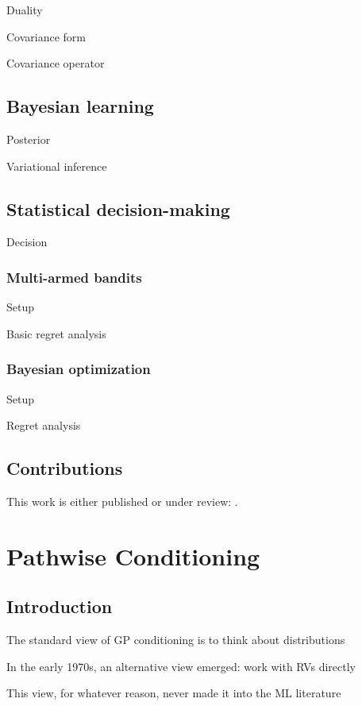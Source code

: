 \documentclass[11pt]{book}
\begin{document}
Duality

Covariance form

Covariance operator

\section{Bayesian learning}

Posterior

Variational inference

\section{Statistical decision-making}

Decision

\subsection{Multi-armed bandits}

Setup

Basic regret analysis

\subsection{Bayesian optimization}

Setup

Regret analysis

\section{Contributions}

This work is either published or under review: \textcite{wilson20,borovitskiy20,borovitskiy21,wilson21,hutchinson21}.



\chapter{Pathwise Conditioning}

\section{Introduction}

The standard view of GP conditioning is to think about distributions

In the early 1970s, an alternative view emerged: work with RVs directly

This view, for whatever reason, never made it into the ML literature
\end{document}
